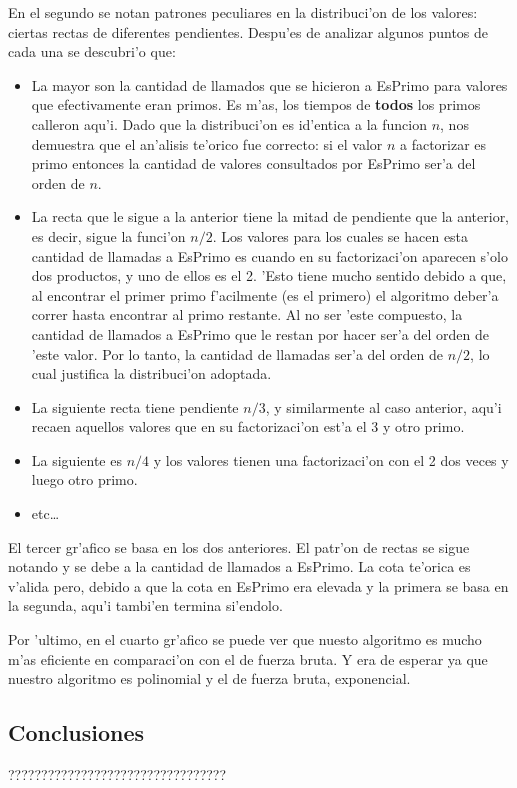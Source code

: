 En el segundo se notan patrones peculiares en la distribuci'on de los valores: ciertas rectas de diferentes pendientes. Despu'es de analizar algunos puntos de cada una se descubri'o que:
\begin{itemize}
\item La mayor son la cantidad de llamados que se hicieron a EsPrimo para valores que efectivamente eran primos. Es m'as, los tiempos de {\bf todos} los primos calleron aqu'i. Dado que la distribuci'on es id'entica a la funcion $n$, nos demuestra que el an'alisis te'orico fue correcto: si el valor $n$ a factorizar es primo entonces la cantidad de valores consultados por EsPrimo ser'a del orden de $n$.
\item La recta que le sigue a la anterior tiene la mitad de pendiente que la anterior, es decir, sigue la funci'on $n/2$. Los valores para los cuales se hacen esta cantidad de llamadas a EsPrimo es cuando en su factorizaci'on aparecen s'olo dos productos, y uno de ellos es el 2. 'Esto tiene mucho sentido debido a que, al encontrar el primer primo f'acilmente (es el primero) el algoritmo deber'a correr hasta encontrar al primo restante. Al no ser 'este compuesto, la cantidad de llamados a EsPrimo que le restan por hacer ser'a del orden de 'este valor. Por lo tanto, la cantidad de llamadas ser'a del orden de $n/2$, lo cual justifica la distribuci'on adoptada.
\item La siguiente recta tiene pendiente $n/3$, y similarmente al caso anterior, aqu'i recaen aquellos valores que en su factorizaci'on est'a el 3 y otro primo.
\item La siguiente es $n/4$ y los valores tienen una factorizaci'on con el 2 dos veces y luego otro primo.
\item etc\dots
\end{itemize}

El tercer gr'afico se basa en los dos anteriores. El patr'on de rectas se sigue notando y se debe a la cantidad de llamados a EsPrimo. La cota te'orica es v'alida pero, debido a que la cota en EsPrimo era elevada y la primera se basa en la segunda, aqu'i tambi'en termina si'endolo.

Por 'ultimo, en el cuarto gr'afico se puede ver que nuesto algoritmo es mucho m'as eficiente en comparaci'on con el de fuerza bruta. Y era de esperar ya que nuestro algoritmo es polinomial y el de fuerza bruta, exponencial.


\subsection{Conclusiones}
?????????????????????????????????
